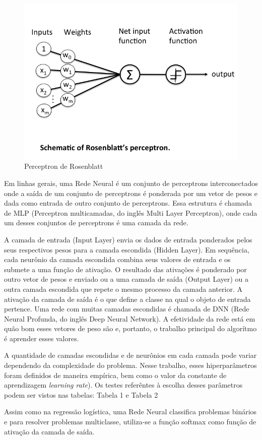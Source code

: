\documentclass[conference]{IEEEtran}
\begin{document}
  \begin{figure}[!h]
      \centering
      \includegraphics[width=0.6\columnwidth]{images/perceptron.png}
      \caption{Perceptron de Rosenblatt}
      \label{fig1}
  \end{figure}
  
  Em linhas gerais, uma Rede Neural é um conjunto de perceptrons interconectados onde a saída de um conjunto de perceptrons é ponderada por um vetor de pesos e dada como entrada de outro conjunto de perceptrons. Essa estrutura é chamada de MLP (Perceptron multicamadas, do inglês Multi Layer Perceptron), onde cada um desses conjuntos de perceptrons é uma camada da rede.
  
  A camada de entrada (Input Layer) envia os dados de entrada ponderados pelos seus respectivos pesos para a camada escondida (Hidden Layer). Em sequência, cada neurônio da camada escondida combina seus valores de entrada e os submete a uma função de ativação. O resultado das ativações é ponderado por outro vetor de pesos e enviado ou a uma camada de saída (Output Layer) ou a outra camada escondida que repete o mesmo processo da camada anterior. A ativação da camada de saída é o que define a classe na qual o objeto de entrada pertence. Uma rede com muitas camadas escondidas é chamada de DNN (Rede Neural Profunda, do inglês Deep Neural Network). A efetividade da rede está em quão bom esses vetores de peso são e, portanto, o trabalho principal do algorítmo é aprender esses valores.
  
  A quantidade de camadas escondidas e de neurônios em cada camada pode variar dependendo da complexidade do problema. Nesse trabalho, esses hiperparâmetros foram definidos de maneira empírica, bem como o valor da constante de aprendizagem \textit{learning rate}). Os testes referêntes à escolha desses parâmetros podem ser vistos nas tabelas: Tabela 1 e Tabela 2
  
  Assim como na regressão logística, uma Rede Neural classifica problemas binários e para resolver problemas multiclasse, utiliza-se a função softmax como função de ativação da camada de saída.
  
\end{document}
